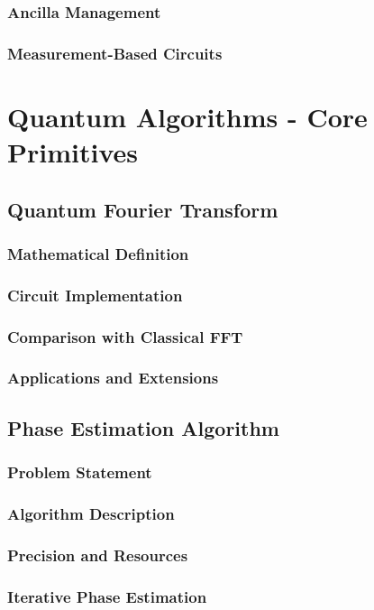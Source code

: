 \documentclass[12pt,a4paper]{book}
\begin{document}
\subsection{Ancilla Management}
\subsection{Measurement-Based Circuits}

\chapter{Quantum Algorithms - Core Primitives}

\section{Quantum Fourier Transform}
\subsection{Mathematical Definition}
\subsection{Circuit Implementation}
\subsection{Comparison with Classical FFT}
\subsection{Applications and Extensions}

\section{Phase Estimation Algorithm}
\subsection{Problem Statement}
\subsection{Algorithm Description}
\subsection{Precision and Resources}
\subsection{Iterative Phase Estimation}
\end{document}
